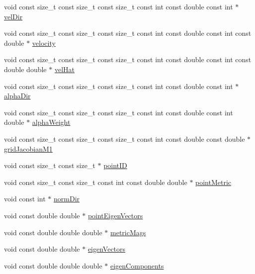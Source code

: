 \begin{DoxyCompactItemize}
\item 
void const size\+\_\+t const size\+\_\+t const size\+\_\+t const int const double const int $\ast$ \hyperlink{MetricKernels_8H_a25df08ad943d494c17a8ce1d64a0da8f}{vel\+Dir}
\item 
void const size\+\_\+t const size\+\_\+t const size\+\_\+t const int const double const int const double $\ast$ \hyperlink{MetricKernels_8H_ac09ce3f593a19c2dae1fe2c3ac95a673}{velocity}
\item 
void const size\+\_\+t const size\+\_\+t const size\+\_\+t const int const double const int const double double $\ast$ \hyperlink{MetricKernels_8H_a05a5c93e8f43d622b504e02893ae3d66}{vel\+Hat}
\item 
void const size\+\_\+t const size\+\_\+t const size\+\_\+t const int const double const int $\ast$ \hyperlink{MetricKernels_8H_a3d083d604bcbd48cccc0421f5328f574}{alpha\+Dir}
\item 
void const size\+\_\+t const size\+\_\+t const size\+\_\+t const int const double const int double $\ast$ \hyperlink{MetricKernels_8H_a213b5d96b4acb2ec07edb3674e2ce0de}{alpha\+Weight}
\item 
void const size\+\_\+t const size\+\_\+t const size\+\_\+t const int const double const double $\ast$ \hyperlink{MetricKernels_8H_a5c19d28b66b8a4b678ae9cff6a54aa47}{grid\+Jacobian\+M1}
\item 
void const size\+\_\+t const size\+\_\+t $\ast$ \hyperlink{MetricKernels_8H_a6c2117dcce3a27f5b4903c92ca4b9909}{point\+ID}
\item 
void const size\+\_\+t const size\+\_\+t const int const double double $\ast$ \hyperlink{MetricKernels_8H_a402c2cf8bde8ab216d05d4da8ccb34b4}{point\+Metric}
\item 
void const int $\ast$ \hyperlink{MetricKernels_8H_ae36835d84fb8e5e32a81e1f1f6c0a69d}{norm\+Dir}
\item 
void const double double $\ast$ \hyperlink{MetricKernels_8H_a54f8f8da2da23aec4d7ad54db95b3d46}{point\+Eigen\+Vectors}
\item 
void const double double double $\ast$ \hyperlink{MetricKernels_8H_aba6c9360151f4fd828af1b31d0fe65b3}{metric\+Mags}
\item 
void const double double $\ast$ \hyperlink{MetricKernels_8H_afb43d750e3a6b4c1549a9589c0f2a7d6}{eigen\+Vectors}
\item 
void const double double double $\ast$ \hyperlink{MetricKernels_8H_ad7c998cbde26ccedfe008bbb660d59fe}{eigen\+Components}
\end{DoxyCompactItemize}


